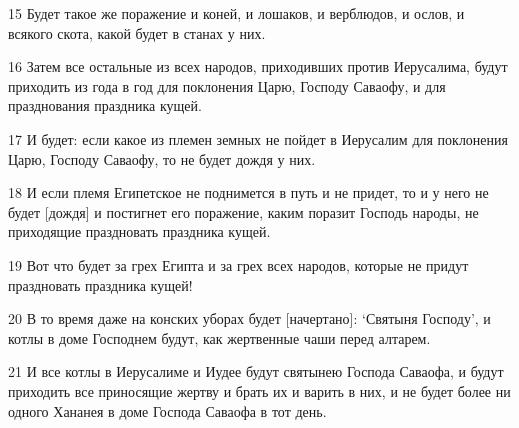 \par 15 Будет такое же поражение и коней, и лошаков, и верблюдов, и ослов, и всякого скота, какой будет в станах у них.
\par 16 Затем все остальные из всех народов, приходивших против Иерусалима, будут приходить из года в год для поклонения Царю, Господу Саваофу, и для празднования праздника кущей.
\par 17 И будет: если какое из племен земных не пойдет в Иерусалим для поклонения Царю, Господу Саваофу, то не будет дождя у них.
\par 18 И если племя Египетское не поднимется в путь и не придет, то и у него не будет [дождя] и постигнет его поражение, каким поразит Господь народы, не приходящие праздновать праздника кущей.
\par 19 Вот что будет за грех Египта и за грех всех народов, которые не придут праздновать праздника кущей!
\par 20 В то время даже на конских уборах будет [начертано]: `Святыня Господу', и котлы в доме Господнем будут, как жертвенные чаши перед алтарем.
\par 21 И все котлы в Иерусалиме и Иудее будут святынею Господа Саваофа, и будут приходить все приносящие жертву и брать их и варить в них, и не будет более ни одного Хананея в доме Господа Саваофа в тот день.


